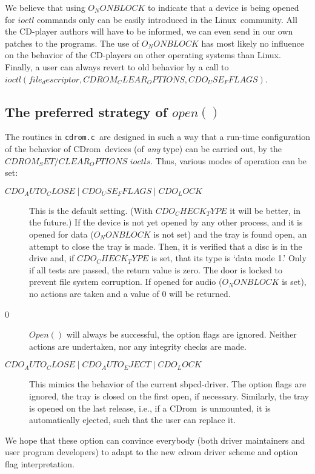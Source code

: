 \documentclass{article}
\def\linux{{\sc Linux}}
\def\cdrom{{\sc CDrom}}
\def\cdromc{{\tt cdrom.c}}
\begin{document}
We believe that using $O_NONBLOCK$ to indicate that a device is being opened
for $ioctl$ commands only can be easily introduced in the \linux\
community. All the CD-player authors will have to be informed, we can
even send in our own patches to the programs. The use of $O_NONBLOCK$
has most likely no influence on the behavior of the CD-players on
other operating systems than \linux. Finally, a user can always revert
to old behavior by a call to $ioctl(file_descriptor, CDROM_CLEAR_OPTIONS,
CDO_USE_FFLAGS)$. 

\subsection{The preferred strategy of $open()$}

The routines in \cdromc\ are designed in such a way that a run-time
configuration of the behavior of \cdrom\ devices (of {\em any\/} type)
can be carried out, by the $CDROM_SET/CLEAR_OPTIONS$ $ioctls$. Thus, various
modes of operation can be set:
\begin{description}
\item[$CDO_AUTO_CLOSE \mathrel| CDO_USE_FFLAGS \mathrel| CDO_LOCK$]
This is the default setting. (With $CDO_CHECK_TYPE$ it will be better,
in the future.) If the device is not yet opened by any other process,
and it is opened for data ($O_NONBLOCK$ is not set) and the tray is
found open, an attempt to close the tray is made. Then, it is verified
that a disc is in the drive and, if $CDO_CHECK_TYPE$ is set, that its
type is `data mode 1.' Only if all tests are passed, the return value
is zero. The door is locked to prevent file system corruption. If
opened for audio ($O_NONBLOCK$ is set), no actions are taken and a
value of 0 will be returned.
\item[0] $Open()$ will always be successful, the option flags are
ignored. Neither actions are undertaken, nor any integrity checks are
made. 
\item[$CDO_AUTO_CLOSE \mathrel| CDO_AUTO_EJECT \mathrel| CDO_LOCK$]
This mimics the behavior of the current sbpcd-driver. The option flags
are ignored, the tray is closed on the first open, if
necessary. Similarly, the tray is opened on the last release, i.e., if
a \cdrom\ is unmounted, it is automatically ejected, such that the
user can replace it. 
\end{description}
We hope that these option can convince everybody (both driver
maintainers and user program developers) to adapt to the new cdrom
driver scheme and option flag interpretation. 
\end{document}
